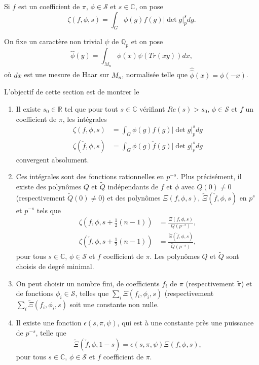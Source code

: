 Si $f$ est un coefficient de $\pi$, $\phi \in \mathcal{S}$ et $s \in \mathbb{C}$, on pose
\begin{equation}
\zeta(f, \phi, s) = \int_G \phi(g)f(g)|\det g|_p^s dg.
\end{equation}

On fixe un caractère non trivial $\psi$ de $\mathbb{Q}_p$ et on pose
\begin{equation}
\hat{\phi}(y) = \int_{M_n} \phi(x) \psi(Tr(xy)) dx,
\end{equation}
où $dx$ est une mesure de Haar sur $M_n$, normalisée telle que $\hat{\hat{\phi}}(x)=\phi(-x)$.

L'objectif de cette section est de montrer le
\begin{theoreme}
\label{thm_padique}
\begin{enumerate}
\item Il existe $s_0 \in \mathbb{R}$ tel que pour tout $s \in \mathbb{C}$ vérifiant $Re (s) > s_0$, $\phi \in \mathcal{S}$ et $f$ un coefficient de $\pi$, les intégrales
\begin{align}
\zeta(f, \phi, s) &= \int_G \phi(g)f(g)|\det g|_p^s dg \\
\zeta(\check{f}, \phi, s) &= \int_G \phi(g)\check{f}(g)|\det g|_p^s dg
\end{align}
convergent absolument.
\item Ces intégrales sont des fonctions rationnelles en $p^{-s}$. Plus précisément, il existe des polynômes $Q$ et $\tilde{Q}$ indépendants de $f$ et $\phi$ avec $Q(0)\neq 0$ (respectivement $\tilde{Q}(0)\neq 0$) et des polynômes $\Xi(f, \phi, s)$, $\tilde{\Xi}(\check{f}, \phi, s)$ en $p^{s}$ et $p^{-s}$ tels que
\begin{align}
\zeta(f, \phi, s+\frac{1}{2}(n-1)) &= \frac{\Xi(f, \phi, s)}{Q(p^{-s})}, \\
\zeta(\check{f}, \phi, s+\frac{1}{2}(n-1)) &= \frac{\tilde{\Xi}(\check{f}, \phi, s)}{\tilde{Q}(p^{-s})},
\end{align}
pour tous $s \in \mathbb{C}$, $\phi \in \mathcal{S}$ et $f$ coefficient de $\pi$. Les polynômes $Q$ et $\tilde{Q}$ sont choisis de degré minimal.
\item On peut choisir un nombre fini, de coefficients $f_i$ de $\pi$ (respectivement $\tilde{\pi}$) et de fonctions $\phi_i \in \mathcal{S}$, telles que $\sum_i \Xi(f_i, \phi_i, s)$ (respectivement $\sum_i \tilde{\Xi}(f_i, \phi_i, s)$ soit une constante non nulle.
\item Il existe une fonction $\epsilon(s, \pi, \psi)$, qui est à une constante près une puissance de $p^{-s}$, telle que
\begin{equation}
\label{epsilon}
\tilde{\Xi}(\check{f}, \hat{\phi}, 1-s) = \epsilon(s, \pi, \psi)\Xi(f, \phi, s),
\end{equation}
pour tous $s\in \mathbb{C}$, $\phi \in \mathcal{S}$ et $f$ coefficient de $\pi$.
\end{enumerate}
\end{theoreme}

